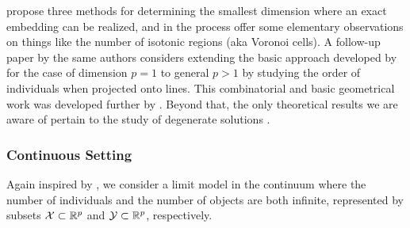 \documentclass[twoside, 11pt]{article}
\begin{document}
\citet{bennett1960multidimensional} propose three methods for determining the smallest dimension where an exact embedding can be realized, and in the process offer some elementary observations on things like the number of isotonic regions (aka Voronoi cells).
A follow-up paper by the same authors \cite{hays1961multidimensional} considers extending the basic approach developed by \citet{coombs1950psychological} for the case of dimension $p=1$ to general $p > 1$ by studying the order of individuals when projected onto lines. 
This combinatorial and basic geometrical work was developed further by \citet{davidson1973geometrical, davidson1972geometrical}.
Beyond that, the only theoretical results we are aware of pertain to the study of degenerate solutions \cite{busing2005avoiding, davidson1973geometrical, de1983}.


\subsubsection{Continuous Setting}
\label{sec:internal point continuum}
Again inspired by \citet{shepard1966metric}, we consider a limit model in the continuum where the number of individuals and the number of objects are both infinite, represented by subsets $\mathcal{X} \subset \mathbb{R}^p$ and $\mathcal{Y} \subset \mathbb{R}^p$, respectively. 
\end{document}
